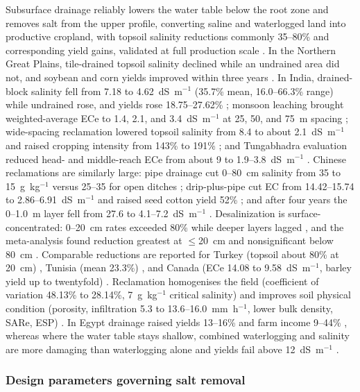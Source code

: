 \documentclass[11pt]{article}
\begin{document}
Subsurface drainage reliably lowers the water table below the root zone and
removes salt from the upper profile, converting saline and waterlogged land into
productive cropland, with topsoil salinity reductions commonly 35--80\% and
corresponding yield gains, validated at full production scale
\parencite{Yang2025,Derby2024}. In the Northern Great Plains, tile-drained
topsoil salinity declined while an undrained area did not, and soybean and corn
yields improved within three years \parencite{Derby2024}. In India, drained-block
salinity fell from 7.18 to 4.62~dS~m$^{-1}$ (35.7\% mean, 16.0--66.3\% range)
while undrained rose, and yields rose 18.75--27.62\% \parencite{Sharma2006};
monsoon leaching brought weighted-average ECe to 1.4, 2.1, and 3.4~dS~m$^{-1}$ at
25, 50, and 75~m spacing \parencite{Sharma2000}; wide-spacing reclamation lowered
topsoil salinity from 8.4 to about 2.1~dS~m$^{-1}$ and raised cropping intensity
from 143\% to 191\% \parencite{Manjunatha2004}; and Tungabhadra evaluation reduced
head- and middle-reach ECe from about 9 to 1.9--3.8~dS~m$^{-1}$
\parencite{Karegoudar2022}. Chinese reclamations are similarly large: pipe
drainage cut 0--80~cm salinity from 35 to 15~g~kg$^{-1}$ versus 25--35 for open
ditches \parencite{Wang2020}; drip-plus-pipe cut EC from 14.42--15.74 to
2.86--6.91~dS~m$^{-1}$ and raised seed cotton yield 52\% \parencite{Heng2021}; and
after four years the 0--1.0~m layer fell from 27.6 to 4.1--7.2~dS~m$^{-1}$
\parencite{Zhang2021}. Desalinization is surface-concentrated: 0--20~cm rates
exceeded 80\% while deeper layers lagged \parencite{Han2023}, and the
meta-analysis found reduction greatest at $\leq$20~cm and nonsignificant below
80~cm \parencite{Yang2025}. Comparable reductions are reported for Turkey
(topsoil about 80\% at 20~cm) \parencite{Bahçeci2009}, Tunisia (mean 23.3\%)
\parencite{HajAmor2019}, and Canada (ECe 14.08 to 9.58~dS~m$^{-1}$, barley yield
up to twentyfold) \parencite{Steppuhn2006,Steppuhn2017}. Reclamation homogenises
the field (coefficient of variation 48.13\% to 28.14\%, 7~g~kg$^{-1}$ critical
salinity) \parencite{Yu2015,Yu2025} and improves soil physical condition
(porosity, infiltration 5.3 to 13.6--16.0~mm~h$^{-1}$, lower bulk density, SARe,
ESP) \parencite{Sharma2000,Yang2025}. In Egypt drainage raised yields 13--16\%
and farm income 9--44\% \parencite{Kotb2000}, whereas where the water table stays
shallow, combined waterlogging and salinity are more damaging than waterlogging
alone and yields fail above 12~dS~m$^{-1}$ \parencite{Kahlown2002}.

\subsubsection{Design parameters governing salt removal}
\end{document}
